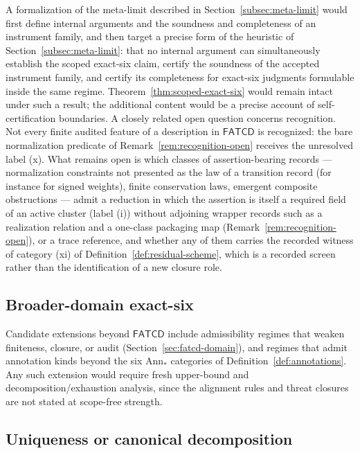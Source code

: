 \documentclass[11pt]{article}
\theoremstyle{definition}
\newcommand{\FATCD}{\ensuremath{\mathsf{FATCD}}}
\begin{document}
A formalization of the meta-limit described in
Section~\ref{subsec:meta-limit} would first define internal arguments and the soundness and completeness of
an instrument family, and then target a precise form of the heuristic of
Section~\ref{subsec:meta-limit}: that no internal argument can simultaneously
establish the scoped exact-six claim, certify the soundness of the
accepted instrument family, and certify its completeness for
exact-six judgments formulable inside the same regime.
Theorem~\ref{thm:scoped-exact-six} would remain intact under such a
result; the additional content would be a precise account of
self-certification boundaries. A closely related open question
concerns recognition. Not every finite audited feature of a description in
\FATCD{} is recognized: the bare normalization predicate of
Remark~\ref{rem:recognition-open} receives the unresolved label (x). What remains open is
which classes of assertion-bearing records --- normalization constraints not
presented as the law of a transition record (for instance for signed weights),
finite conservation laws, emergent composite obstructions --- admit a reduction
in which the assertion is itself a required field of an active cluster
(label (i)) without adjoining wrapper records such as a realization relation
and a one-class packaging map (Remark~\ref{rem:recognition-open}), or a trace
reference, and whether any of
them carries the recorded witness of category (xi) of
Definition~\ref{def:residual-scheme}, which is a recorded screen rather than
the identification of a new closure role.

\subsection{Broader-domain exact-six}\label{subsec:future-broader-domain}

Candidate extensions beyond \FATCD{} include admissibility regimes
that weaken finiteness, closure, or audit
(Section~\ref{sec:fatcd-domain}), and regimes that admit annotation
kinds beyond the six \(\mathrm{Ann}_*\) categories of
Definition~\ref{def:annotations}. Any such extension would require
fresh upper-bound and decomposition/exhaustion analysis, since the
alignment rules and threat closures are not stated at scope-free
strength.

\subsection{Uniqueness or canonical decomposition}\label{subsec:future-uniqueness}
\end{document}
